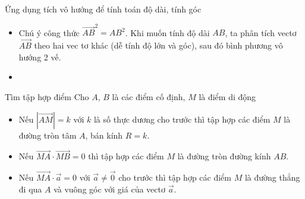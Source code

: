 \begin{dang}{Ứng dụng tích vô hướng để tính toán độ dài, tính góc}
	\begin{itemize}
		\item [\iconMT]  Chú ý công thức $\vec{AB}^2=AB^2$. Khi muốn tính độ dài $AB$, ta phân tích vectơ $\vec{AB}$ theo hai vec tơ khác (dễ tính độ lớn và góc), sau đó bình phương vô hướng 2 vế.
		\item [\iconMT]   
	\end{itemize}
\end{dang}

\begin{dang}{Tìm tập hợp điểm}
	Cho $A$, $B$ là các điểm cố định, $M$ là điểm di động
	\begin{itemize}
		\item Nếu $\left| \vec{AM} \right|=k$ với $k$ là số thực dương cho trước thì tập hợp các điểm $M$ là đường tròn tâm $A$, bán kính $R=k$.
		\item Nếu $\vec{MA}\cdot \vec{MB}=0$ thì tập hợp các điểm $M$ là đường tròn đường kính $AB$.
		\item Nếu $\vec{MA}\cdot \vec{a}=0$ với $\vec{a}\neq \vec{0}$ cho trước thì tập hợp các điểm $M$ là đường thẳng đi qua $A$ và vuông góc với giá của vectơ $\vec{a}$.
	\end{itemize}
\end{dang}


